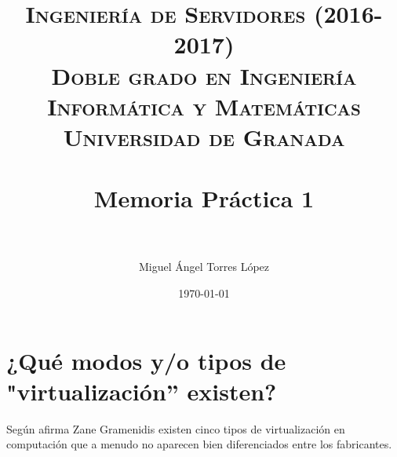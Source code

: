


\title{	
\normalfont \normalsize 
\textsc{\textbf{Ingeniería de Servidores (2016-2017)} \\ Doble grado en Ingeniería Informática y Matemáticas \\ Universidad de Granada} \\ [25pt] %
\horrule{2pt} \\[0.4cm] %
\huge Memoria Práctica 1 \\ %
\horrule{2pt} \\[0.5cm] %
}

\author{Miguel Ángel Torres López} %

\date{\normalsize\today} %




\maketitle %

\newpage %

\tableofcontents %

\newpage

\listoffigures

\listoftables

\newpage


\section{¿Qué modos y/o tipos de "virtualización'' existen?}

Según afirma Zane Gramenidis\cite{cita1} existen cinco tipos de virtualización en computación que a menudo no aparecen bien diferenciados entre los fabricantes.

